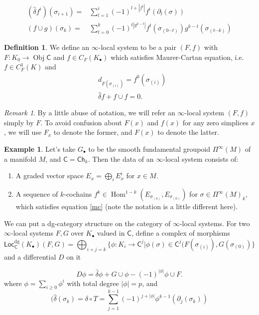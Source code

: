 \documentclass[12pt]{amsart}
\theoremstyle{definition}
\newtheorem{example}[thm]{Example}
\newtheorem{defn}[thm]{Definition}
\theoremstyle{remark}
\newtheorem{rem}[thm]{Remark}
\numberwithin{equation}{section}
\newcommand{\del}{\partial}
\renewcommand{\del}{\partial}
\newcommand{\CC}{{\mathsf C}}
\newcommand{\1}{{\mathbb{1}}}
\newcommand{\ob}{\operatorname{Obj}}
\newcommand{\Ch}{\mathsf{Ch}}
\newcommand{\Loc}{\mathsf{Loc}}
\newcommand{\bt}{\bullet}
\newcommand{\dg}{{\operatorname{dg}}}
\newcommand{\Hom}{\operatorname{Hom}}
\begin{document}
\begin{align*}
    (\hat{\delta} f^i)(\sigma_{i + 1}) =& \sum^i_{l = 1}(-1)^{l + |f^i|} f^i(\del_l(\sigma))\\
    (f\cup g)(\sigma_k) =& \sum_{t = 0}^k (-1)^{t|g^{k - t}|} f^t(\sigma_{(0\cdots t)}) g^{k - t}(\sigma_{(t\cdots k)})
\end{align*}

\begin{defn}
We define an $\infty$-local system to be a pair $(F, f)$ with $F: K_0 \to \ob \CC$ and $f\in C_F(K_{\bullet})$ which satisfies Maurer-Cartan equation, i.e. $f\in C^1_F(K)$ and 
\begin{align}\label{mc}
    &d_{F(\sigma_{(i)})} = f^0(\sigma_{(i)})\\
    &\hat{\delta} f + f\cup f = 0.
\end{align}
\end{defn}
\begin{rem}
    By a little abuse of notation, we will refer an $\infty$-local system $(F, f)$ simply by $F$. To avoid confusion about $F(x)$ and $f(x)$ for any zero simplices $x$, we will use $F_x$ to denote the former, and $F(x)$ to denote the latter.
\end{rem}
\begin{example}
    Let's take $G_{\bt}$ to be the smooth fundamental groupoid $\Pi^{\infty}(M)$ of a manifold $M$, and $\CC = \Ch_k$. Then the data of an $\infty$-local system consists of:
    \begin{enumerate}
        \item A graded vector space $E_x = \bigoplus_i E^i_x$ for $x \in M$.
        \item A sequence of $k$-cochains $f^k\in \Hom^{1-k}(E_{\sigma_{(k)}}, E_{\sigma_{(0)}})$ for $\sigma \in \Pi^{\infty}(M)_k$, which satisfies equation \ref{mc} (note the notation is a little different here).
    \end{enumerate}
\end{example}



We can put a dg-category structure on the category of $\infty$-local systems. For two $\infty$-local systems $F, G$ over $K_{\bullet}$ valued in $\CC$, define a complex of morphisms
$$
\Loc_{\CC}^{\dg}(K_{\bullet})(F,G) = \bigoplus_{i + j = k} \{\phi: K_i \to \CC^j| \phi(\sigma) \in \CC^j(F(\sigma_{(i)}), G(\sigma_{(0)}) \} 
$$
and a differential $D$ on it

$$
D \phi = \hat{\delta}\phi + G\cup \phi  - (-1)^{|\phi|}\phi \cup F.
$$
where $\phi = \sum_{i\ge 0} \phi^i$ with total degree $|\phi| = p$, and 
$$
(\hat{\delta}(\sigma_k) = \delta\circ T = \sum_{j = 1}^{k - 1}(-1)^{j + |\phi|} \phi^{k - 1}(\del_j(\sigma_k))
$$
\end{document}
